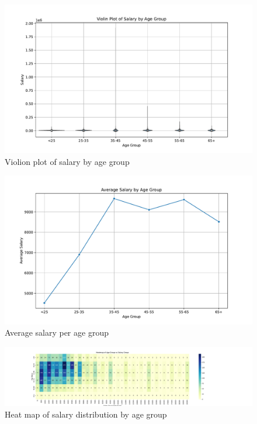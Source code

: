 \begin{figure}[H]
    \centering
    \includegraphics[width=\columnwidth]{images/hyp3_salary_by_age_violin.pdf} %
    \caption{Violion plot of salary by age group}
    \label{fig:violion plot of salary by age group}
\end{figure}

\begin{figure}[H]
    \centering
    \includegraphics[width=\columnwidth]{images/hyp_3_average_salary.pdf} %
    \caption{Average salary per age group}
    \label{fig:average salary per age group}
\end{figure}

\begin{figure}[H]
    \centering
    \includegraphics[width=\columnwidth]{images/hyp_3_heat_map.pdf} %
    \caption{Heat map of salary distribution by age group}
    \label{fig:salary distribution heat map}
\end{figure}

